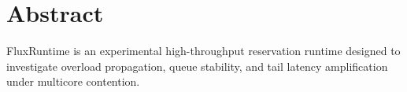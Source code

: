 \section{Abstract}

FluxRuntime is an experimental high-throughput reservation runtime designed to investigate overload propagation, queue stability, and tail latency amplification under multicore contention.
